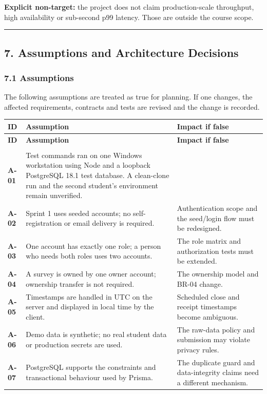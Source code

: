 \documentclass[12pt,a4paper]{article}
\begin{document}
\textbf{Explicit non-target:} the project does not claim production-scale throughput, high availability or sub-second p99 latency. Those are outside the course scope.

\medskip\noindent\rule{\linewidth}{0.4pt}\medskip

\subsection*{7. Assumptions and Architecture Decisions}
\subsubsection*{7.1 Assumptions}
The following assumptions are treated as true for planning. If one changes, the affected requirements, contracts and tests are revised and the change is recorded.

{\setlength{\tabcolsep}{3pt}\renewcommand{\arraystretch}{1.08}\small
\begin{longtable}{@{}>{\raggedright\arraybackslash}p{}>{\raggedright\arraybackslash}p{}>{\raggedright\arraybackslash}p{}@{}}
\toprule
\textbf{ID} & \textbf{Assumption} & \textbf{Impact if false} \\
\midrule
\endfirsthead
\toprule
\textbf{ID} & \textbf{Assumption} & \textbf{Impact if false} \\
\midrule
\endhead
\midrule
\multicolumn{3}{r}{\footnotesize\textit{Continued on next page}}\\
\endfoot
\bottomrule
\endlastfoot
\textbf{A-01} & Test commands ran on one Windows workstation using Node and a loopback PostgreSQL 18.1 test database. A clean-clone run and the second student's environment remain unverified. \\
\textbf{A-02} & Sprint 1 uses seeded accounts; no self-registration or email delivery is required. & Authentication scope and the seed/login flow must be redesigned. \\
\textbf{A-03} & One account has exactly one role; a person who needs both roles uses two accounts. & The role matrix and authorization tests must be extended. \\
\textbf{A-04} & A survey is owned by one owner account; ownership transfer is not required. & The ownership model and BR-04 change. \\
\textbf{A-05} & Timestamps are handled in UTC on the server and displayed in local time by the client. & Scheduled close and receipt timestamps become ambiguous. \\
\textbf{A-06} & Demo data is synthetic; no real student data or production secrets are used. & The raw-data policy and submission may violate privacy rules. \\
\textbf{A-07} & PostgreSQL supports the constraints and transactional behaviour used by Prisma. & The duplicate guard and data-integrity claims need a different mechanism. \\
\end{longtable}}
\end{document}
